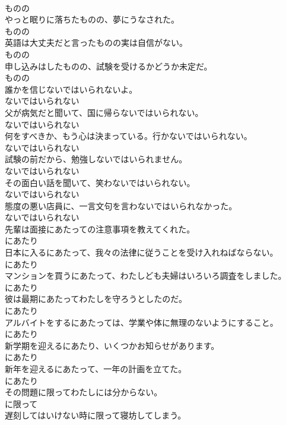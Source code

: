 \documentclass[8pt]{extreport}
\begin{document}
\begin{CJK}{UTF8}{min}
\\	ものの
\\	やっと眠りに落ちたものの、夢にうなされた。	
\\	ものの
\\	英語は大丈夫だと言ったものの実は自信がない。	
\\	ものの
\\	申し込みはしたものの、試験を受けるかどうか未定だ。	
\\	ものの
\\	誰かを信じないではいられないよ。	
\\	ないではいられない
\\	父が病気だと聞いて、国に帰らないではいられない。	
\\	ないではいられない
\\	何をすべきか、もう心は決まっている。行かないではいられない。	
\\	ないではいられない
\\	試験の前だから、勉強しないではいられません。	
\\	ないではいられない
\\	その面白い話を聞いて、笑わないではいられない。	
\\	ないではいられない
\\	態度の悪い店員に、一言文句を言わないではいられなかった。	
\\	ないではいられない
\\	先輩は面接にあたっての注意事項を教えてくれた。	
\\	にあたり
\\	日本に入るにあたって、我々の法律に従うことを受け入れねばならない。	
\\	にあたり
\\	マンションを買うにあたって、わたしども夫婦はいろいろ調査をしました。	
\\	にあたり
\\	彼は最期にあたってわたしを守ろうとしたのだ。	
\\	にあたり
\\	アルバイトをするにあたっては、学業や体に無理のないようにすること。	
\\	にあたり
\\	新学期を迎えるにあたり、いくつかお知らせがあります。	
\\	にあたり
\\	新年を迎えるにあたって、一年の計画を立てた。	
\\	にあたり
\\	その問題に限ってわたしには分からない。	
\\	に限って
\\	遅刻してはいけない時に限って寝坊してしまう。	

\end{CJK}
\end{document}
